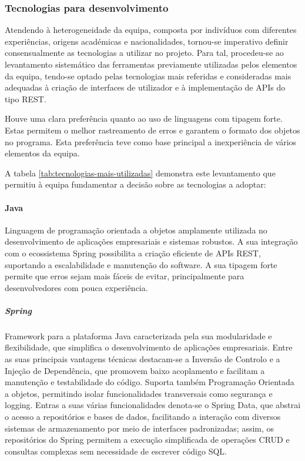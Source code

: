 \subsubsection{Tecnologias para desenvolvimento}

Atendendo à heterogeneidade da equipa, composta por indivíduos com diferentes experiências, origens académicas e nacionalidades, tornou-se imperativo definir consensualmente as tecnologias a utilizar no projeto. Para tal, procedeu-se ao levantamento sistemático das ferramentas previamente utilizadas pelos elementos da equipa, tendo-se optado pelas tecnologias mais referidas e consideradas mais adequadas à criação de interfaces de utilizador e à implementação de APIs do tipo REST. 

Houve uma clara preferência quanto ao uso de linguagens com tipagem forte. Estas permitem o melhor rastreamento de erros e garantem o formato dos objetos no programa. Esta preferência teve como base principal a inexperiência de vários elementos da equipa.

A tabela \ref{tab:tecnologias-mais-utilizadas} demonstra este levantamento que permitiu à equipa fundamentar a decisão sobre as tecnologias a adoptar:



\pagebreak

\paragraph{Java} Linguagem de programação orientada a objetos amplamente utilizada no desenvolvimento de aplicações empresariais e sistemas robustos. A sua integração com o ecossistema Spring possibilita a criação eficiente de APIs REST, suportando a escalabilidade e manutenção do software. A sua tipagem forte permite que erros sejam mais fáceis de evitar, principalmente para desenvolvedores com pouca experiência.  

\subparagraph{Spring} Framework para a plataforma Java caracterizada pela sua modularidade e flexibilidade, que simplifica o desenvolvimento de aplicações empresariais. Entre as suas principais vantagens técnicas destacam-se a Inversão de Controlo e a Injeção de Dependência, que promovem baixo acoplamento e facilitam a manutenção e testabilidade do código. Suporta também Programação Orientada a objetos, permitindo isolar funcionalidades transversais como segurança e logging. Entras a suas várias funcionalidades denota-se o Spring Data, que abstrai o acesso a repositórios e bases de dados, facilitando a interação com diversos sistemas de armazenamento por meio de interfaces padronizadas; assim, os repositórios do Spring permitem a execução simplificada de operações CRUD e consultas complexas sem necessidade de escrever código SQL.

